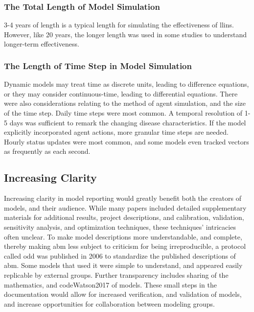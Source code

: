 \documentclass[a4paper, 12pt, twoside]{report}
\begin{document}
\subsubsection{The Total Length of Model Simulation}
3-4 years of length is a typical length for simulating the effectiveness of \gls{llins}.
However, like 20 years, the longer length was used in some studies to understand longer-term effectiveness\cite{Walker2016}.

\subsubsection{The Length of Time Step in Model Simulation}%
\label{subsub:time_step}
Dynamic models may treat time as discrete units, leading to difference equations, or they may consider continuous-time, leading to differential equations.
There were also considerations relating to the method of agent simulation, and the size of the time step.
Daily time steps were most common.
A temporal resolution of 1-5 days was sufficient to remark the changing disease characteristics.
If the model explicitly incorporated agent actions, more granular time steps are needed.
Hourly status updates were most common, and some models even tracked vectors as frequently as each second.



\subsection{Increasing Clarity}%
\label{sub:incresing_clarity}
Increasing clarity in model reporting would greatly benefit both the creators of models, and their audience.
While many papers included detailed supplementary materials for additional results, project descriptions, and calibration, validation, sensitivity analysis, and optimization techniques, these techniques' intricacies often unclear.
To make model descriptions more understandable, and complete, thereby making \gls{abm} less subject to criticism for being irreproducible, a protocol called \gls{odd} \cite{Grimm2010} was published in 2006 to standardize the published descriptions of \gls{abm}.
Some models that used it \cite{Zhu2015, Zhu2015a, Watson2017} were simple to understand, and appeared easily replicable by external groups.
Further transparency includes sharing of the mathematics, and code{Watson2017} of models.
These small steps in the documentation would allow for increased verification, and validation of models, and increase opportunities for collaboration between modeling groups.
\end{document}
